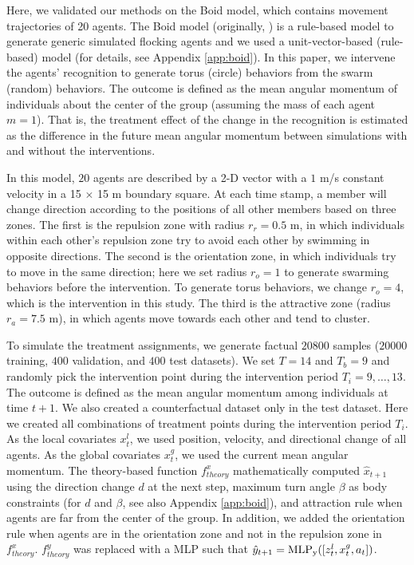 \documentclass[journal]{IEEEtran}
\begin{document}
Here, we validated our methods on the Boid model, which contains movement trajectories of 20 agents.
The Boid model (originally, \cite{reynolds1987flocks}) is a rule-based model to generate generic simulated flocking agents and we used a unit-vector-based (rule-based) model \cite{Couzin02} (for details, see Appendix \ref{app:boid}).
In this paper, we intervene the agents' recognition to generate torus (circle) behaviors from the swarm (random) behaviors.
The outcome is defined as the mean angular momentum of individuals about the center of the group (assuming the mass of each agent $m=1$). %
That is, the treatment effect of the change in the recognition is estimated as the difference in the future mean angular momentum between simulations with and without the interventions.

In this model, $20$ agents are described by a 2-D vector with a $1$ m/s constant velocity in a 15 $\times$ 15 m boundary square.
At each time stamp, a member will change direction according to the positions of all other members based on three zones.
The first is the repulsion zone with radius $r_r = 0.5$ m, in which individuals within each other’s repulsion zone try to avoid each other by swimming in opposite directions. 
The second is the orientation zone, in which individuals try to move in the same direction; 
here we set radius $r_o = 1$ to generate swarming behaviors before the intervention. 
To generate torus behaviors, we change $r_o = 4$, which is the intervention in this study.
The third is the attractive zone (radius $r_a = 7.5$ m), in which agents move towards each other and tend to cluster.

To simulate the treatment assignments, we generate factual $20800$ samples ($20000$ training, $400$ validation, and $400$ test datasets).
We set $T=14$ and $T_b = 9$ and randomly pick the intervention point during the intervention period $T_i = 9,\ldots,13$. 
The outcome is defined as the mean angular momentum among individuals at time $t+1$. %
We also created a counterfactual dataset only in the test dataset.
Here we created all combinations of treatment points during the intervention period $T_i$. 
As the local covariates $x^l_t$, we used position, velocity, and directional change of all agents.
As the global covariates $x^g_t$, we used the current mean angular momentum.
The theory-based function $f^x_{theory}$ mathematically computed $\hat{x}_{t+1}$ using the direction change $d$ at the next step, maximum turn angle $\beta$ as body constraints (for $d$ and $\beta$, see also Appendix \ref{app:boid}), and attraction rule when agents are far from the center of the group.
In addition, we added the orientation rule when agents are in the orientation zone and not in the repulsion zone in $f^x_{theory}$. 
$f^y_{theory}$ was replaced with a MLP such that $\hat{y}_{t+1} = {\rm{MLP_y}}([z^l_t,x^g_t,a_t])$.
\end{document}
